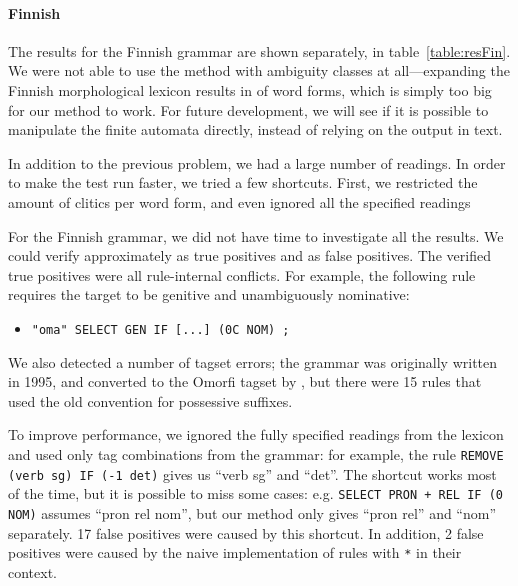 \paragraph{Finnish} 

The results for the Finnish grammar are shown separately, in table~\ref{table:resFin}.
We were not able to use the method with ambiguity classes at all---expanding the Finnish morphological lexicon results in  of word forms, which is simply too big for our method to work. 
For future development, we will see if it is possible to manipulate the finite automata directly, instead of relying on the output in text.

In addition to the previous problem, we had a large number of readings. In order to make the test run faster, we tried a few shortcuts. First, we restricted the amount of clitics per word form, and even ignored all the specified readings

For the Finnish grammar, we did not have time to investigate all the
results. We could verify approximately  as true positives and
 as false positives.
The verified true positives were all rule-internal conflicts. 
For example, the following rule requires the target to be genitive and unambiguously nominative: 
\begin{itemize}
\item[]\texttt{"oma" SELECT GEN IF [...] (0C NOM) ;}
\end{itemize}
We also detected a number of tagset errors;
the grammar was originally written in 1995, and converted to the
Omorfi tagset by \cite{pirinen2015}, but there were 15 rules that used the old convention for possessive suffixes.

To improve performance, we ignored the fully specified readings from the
lexicon and used only tag combinations from the grammar:
for example, the rule \texttt{REMOVE (verb sg) IF (-1 det)}
gives us ``verb sg'' and ``det''.
The shortcut works most of the time, but it is possible to
miss some cases: e.g. \texttt{SELECT PRON + REL IF (0 NOM)} 
assumes ``pron rel nom'', but our method only gives
``pron rel'' and ``nom'' separately. 
17 false positives were caused by this shortcut. 
In addition, 2 false positives were caused by the naive implementation of
rules with \verb!*! in their context.

